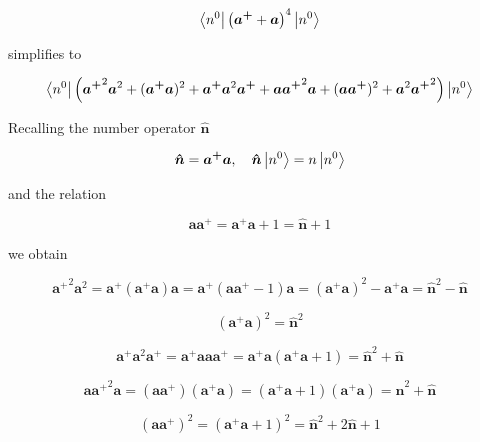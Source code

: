 \documentclass{article}
\begin{document}
\begin{equation}
\label{eq:a_sandwich}
\bra{n^0} \left( \bm{a^+} + \bm{a} \right)^4 \ket{n^0}
\end{equation}

simplifies to

\begin{equation}
\label{eq:simplified_a_sandwich}
\bra{n^0} \left( {\bm{a^+}}^2 \bm{a}^2 + (\bm{a^+} \bm{a})^2 + \bm{a^+} \bm{a}^2 \bm{a^+} + \bm{a} {\bm{a^+}}^2 \bm{a} + (\bm{a} \bm{a^+})^2 + \bm{a}^2 {\bm{a^+}}^2 \right) \ket{n^0}
\end{equation}

Recalling the number operator \( \bm{ \hat{n} } \)

\begin{equation}
\bm{ \hat{n} } = \bm{a^+} \bm{a}, \quad \bm{ \hat{n} } \ket{n^0} = n\ket{n^0}
\end{equation}

and the relation

\begin{equation}
\bm{a} \bm{a^+} = \bm{a^+} \bm{a} + 1 = \bm{ \hat{n} } + 1
\end{equation}

we obtain

\begin{equation}
{\bm{a^+}}^2 \bm{a}^2 = \bm{a^+} (\bm{a^+} \bm{a}) \bm{a} = \bm{a^+} ( \bm{a} \bm{a^+} - 1) \bm{a} = (\bm{a^+} \bm{a})^2 - \bm{a^+} \bm{a} = \bm{ \hat{n} }^2 - \bm{ \hat{n} }
\end{equation}

\begin{equation}
(\bm{a^+} \bm{a})^2 = \bm{ \hat{n} }^2
\end{equation}

\begin{equation}
\bm{a^+} \bm{a}^2 \bm{a^+} = \bm{a^+} \bm{a} \bm{a} \bm{a^+} = \bm{a^+} \bm{a} (\bm{a^+} \bm{a} + 1) = \bm{ \hat{n} }^2 + \bm{ \hat{n} }
\end{equation}

\begin{equation}
\bm{a} {\bm{a^+}}^2 \bm{a} = (\bm{a} \bm{a^+})(\bm{a^+} \bm{a}) = (\bm{a^+} \bm{a} + 1) (\bm{a^+} \bm{a}) = \bm{ \hat{n} }^2 + \bm{ \hat{n} }
\end{equation}

\begin{equation}
(\bm{a} \bm{a^+})^2 = (\bm{a^+} \bm{a} + 1)^2 = \bm{ \hat{n} }^2 + 2 \bm{ \hat{n} } + 1
\end{equation}
\end{document}
